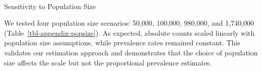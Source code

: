 \documentclass[
  12pt,
  letterpaper,
  DIV=11,
  numbers=noendperiod]{scrartcl}
\makeatletter
\let\oldparagraph\paragraph
\renewcommand{\paragraph}{
    \@ifstar
      \xxxParagraphStar
      \xxxParagraphNoStar
  }
\newcommand{\xxxParagraphStar}[1]{\oldparagraph*{#1}\mbox{}}
\newcommand{\xxxParagraphNoStar}[1]{\oldparagraph{#1}\mbox{}}
\theoremstyle{plain}
\theoremstyle{definition}
\makeatother
\begin{document}
\begin{table}
{}

\end{table}%

\paragraph{Sensitivity to Population
Size}\label{sensitivity-to-population-size}

We tested four population size scenarios: 50,000, 100,000, 980,000, and
1,740,000 (Table~\ref{tbl-appendix-popsize}). As expected, absolute
counts scaled linearly with population size assumptions, while
prevalence rates remained constant. This validates our estimation
approach and demonstrates that the choice of population size affects the
scale but not the proportional prevalence estimates.

\begin{table}

\caption{\label{tbl-appendix-popsize}Sensitivity Analysis: Population
Size Comparison. All estimates use neighborhood bootstrap, SS weights,
and MBSU (Moderate) adjustment. Source: Authors' Own Work.}

\centering{

\centering\begingroup\fontsize{8}{10}\selectfont

}
\end{table}
\end{document}
